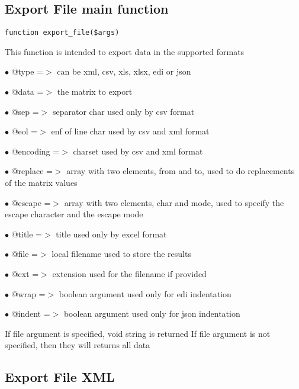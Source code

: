 \documentclass[a4paper]{book}
\begin{document}
\hypertarget{toc120}{}
\subsection{Export File main function}

\begin{lstlisting}
function export_file($args)
\end{lstlisting}

This function is intended to export data in the supported formats

\begin{compactitem}
\item[\color{myblue}$\bullet$] @type     =$>$ can be xml, csv, xls, xlsx, edi or json
\item[\color{myblue}$\bullet$] @data     =$>$ the matrix to export
\item[\color{myblue}$\bullet$] @sep      =$>$ separator char used only by csv format
\item[\color{myblue}$\bullet$] @eol      =$>$ enf of line char used by csv and xml format
\item[\color{myblue}$\bullet$] @encoding =$>$ charset used by csv and xml format
\item[\color{myblue}$\bullet$] @replace  =$>$ array with two elements, from and to, used to do replacements of the matrix values
\item[\color{myblue}$\bullet$] @escape   =$>$ array with two elements, char and mode, used to specify the escape character and the
             escape mode
\item[\color{myblue}$\bullet$] @title    =$>$ title used only by excel format
\item[\color{myblue}$\bullet$] @file     =$>$ local filename used to store the results
\item[\color{myblue}$\bullet$] @ext      =$>$ extension used for the filename if provided
\item[\color{myblue}$\bullet$] @wrap     =$>$ boolean argument used only for edi indentation
\item[\color{myblue}$\bullet$] @indent   =$>$ boolean argument used only for json indentation
\end{compactitem}

If file argument is specified, void string is returned
If file argument is not specified, then they will returns all data

\hypertarget{toc121}{}
\subsection{Export File XML}
\end{document}
